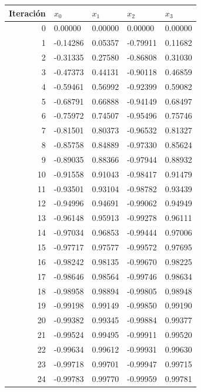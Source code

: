 \begin{itemize}
\begin{center}
    \begin{tabular}{r|llll}
        Iteración & $x_0$ & $x_1$ & $x_2$ & $x_3$ \\
        \hline
        0 & 0.00000 & 0.00000 & 0.00000 & 0.00000 \\
        1 & -0.14286 & 0.05357 & -0.79911 & 0.11682 \\
        2 & -0.31335 & 0.27580 & -0.86808 & 0.31030 \\
        3 & -0.47373 & 0.44131 & -0.90118 & 0.46859 \\
        4 & -0.59461 & 0.56992 & -0.92399 & 0.59082 \\
        5 & -0.68791 & 0.66888 & -0.94149 & 0.68497 \\
        6 & -0.75972 & 0.74507 & -0.95496 & 0.75746 \\
        7 & -0.81501 & 0.80373 & -0.96532 & 0.81327 \\
        8 & -0.85758 & 0.84889 & -0.97330 & 0.85624 \\
        9 & -0.89035 & 0.88366 & -0.97944 & 0.88932 \\
        10 & -0.91558 & 0.91043 & -0.98417 & 0.91479 \\
        11 & -0.93501 & 0.93104 & -0.98782 & 0.93439 \\
        12 & -0.94996 & 0.94691 & -0.99062 & 0.94949 \\
        13 & -0.96148 & 0.95913 & -0.99278 & 0.96111 \\
        14 & -0.97034 & 0.96853 & -0.99444 & 0.97006 \\
        15 & -0.97717 & 0.97577 & -0.99572 & 0.97695 \\
        16 & -0.98242 & 0.98135 & -0.99670 & 0.98225 \\
        17 & -0.98646 & 0.98564 & -0.99746 & 0.98634 \\
        18 & -0.98958 & 0.98894 & -0.99805 & 0.98948 \\
        19 & -0.99198 & 0.99149 & -0.99850 & 0.99190 \\
        20 & -0.99382 & 0.99345 & -0.99884 & 0.99377 \\
        21 & -0.99524 & 0.99495 & -0.99911 & 0.99520 \\
        22 & -0.99634 & 0.99612 & -0.99931 & 0.99630 \\
        23 & -0.99718 & 0.99701 & -0.99947 & 0.99715 \\
        24 & -0.99783 & 0.99770 & -0.99959 & 0.99781 \\

\end{tabular}
\end{center}
\end{itemize}
